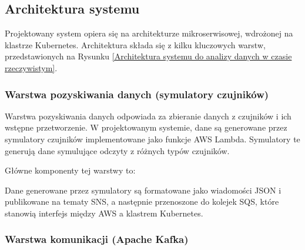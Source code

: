 \subsection{Architektura systemu}
\label{subsec:architektura}

Projektowany system opiera się na architekturze mikroserwisowej, wdrożonej na klastrze Kubernetes.
Architektura składa się z kilku kluczowych warstw, przedstawionych na Rysunku \ref{Architektura systemu do analizy danych w czasie rzeczywistym}.


\subsubsection{Warstwa pozyskiwania danych (symulatory czujników)}
\label{subsubsec:warstwa_pozyskiwania}

Warstwa pozyskiwania danych odpowiada za zbieranie danych z czujników i ich wstępne przetworzenie.
W projektowanym systemie, dane są generowane przez symulatory czujników implementowane jako funkcje AWS Lambda.
Symulatory te generują dane symulujące odczyty z różnych typów czujników.

Główne komponenty tej warstwy to:


Dane generowane przez symulatory są formatowane jako wiadomości JSON i publikowane na tematy SNS, a następnie przenoszone do kolejek SQS,
które stanowią interfejs między AWS a klastrem Kubernetes.

\subsubsection{Warstwa komunikacji (Apache Kafka)}
\label{subsubsec:warstwa_komunikacji}

